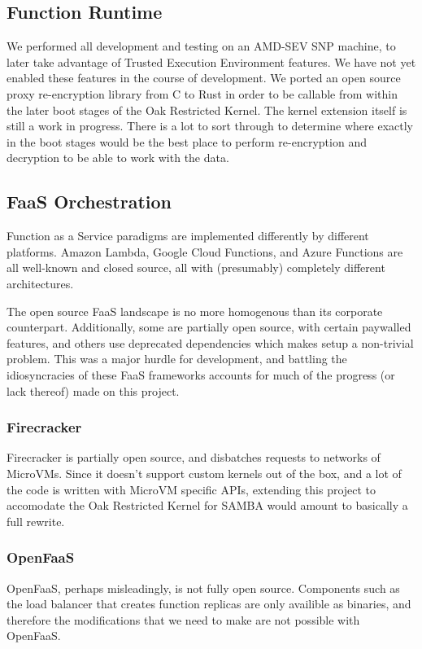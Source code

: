 \subsection{Function Runtime}
We performed all development and testing on an AMD-SEV SNP machine, to later take advantage of Trusted Execution Environment features.
We have not yet enabled these features in the course of development.
We ported an open source proxy re-encryption library from C to Rust in order to be callable from within the later boot stages of the Oak Restricted Kernel.
The kernel extension itself is still a work in progress.
There is a lot to sort through to determine where exactly in the boot stages would be the best place to perform re-encryption and decryption
to be able to work with the data.

\subsection{FaaS Orchestration}
Function as a Service paradigms are implemented differently by different platforms.
Amazon Lambda, Google Cloud Functions, and Azure Functions are all well-known and closed source, all with (presumably) completely different architectures.

The open source FaaS landscape is no more homogenous than its corporate counterpart.
Additionally, some are partially open source, with certain paywalled features, and others use deprecated dependencies which makes setup a non-trivial problem.
This was a major hurdle for development, and battling the idiosyncracies of these FaaS frameworks accounts for much of the progress (or lack thereof) made on this project.

\subsubsection{Firecracker}
Firecracker is partially open source, and disbatches requests to networks of MicroVMs.
Since it doesn't support custom kernels out of the box, and a lot of the code is written with MicroVM specific APIs, extending this project to accomodate the Oak Restricted Kernel for SAMBA would amount to basically a full rewrite.

\subsubsection{OpenFaaS}
OpenFaaS, perhaps misleadingly, is not fully open source.
Components such as the load balancer that creates function replicas are only availible as binaries, and therefore the modifications that we need to make are not possible with OpenFaaS.

